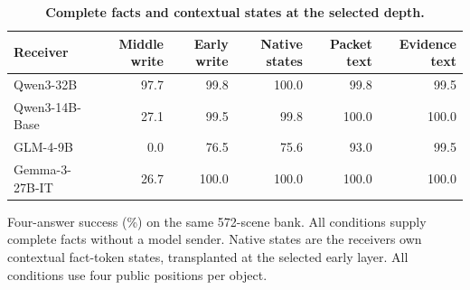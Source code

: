 \begin{table}[!htbp]
\caption{\textbf{Complete facts and contextual states at the selected depth.}}
\label{tab:recovery_capacity}
\centering\small
\setlength{\tabcolsep}{3pt}\renewcommand{\arraystretch}{1.08}
\begin{tabular*}{\linewidth}{@{\extracolsep{\fill}}lrrrrr@{}}
\toprule
Receiver & Middle write & Early write & Native states & Packet text & Evidence text \\
\midrule
Qwen3-32B & 97.7 & 99.8 & 100.0 & 99.8 & 99.5 \\
Qwen3-14B-Base & 27.1 & 99.5 & 99.8 & 100.0 & 100.0 \\
GLM-4-9B & 0.0 & 76.5 & 75.6 & 93.0 & 99.5 \\
Gemma-3-27B-IT & 26.7 & 100.0 & 100.0 & 100.0 & 100.0 \\
\bottomrule
\end{tabular*}
\par\vspace{3pt}
{\footnotesize\raggedright Four-answer success (\%) on the same 572-scene bank. All conditions supply complete facts without a model sender. Native states are the receiver\textquotesingle s own contextual fact-token states, transplanted at the selected early layer. All conditions use four public positions per object.\par}
\end{table}
